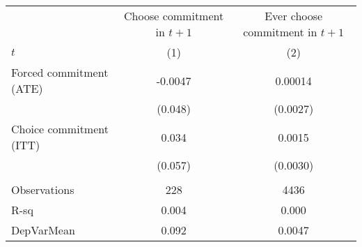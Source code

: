 \begin{tabular}{lcc}
\toprule
      & Choose commitment in $t+1$ & Ever choose commitment in $t+1$ \\
\cmidrule{2-3}$t$   & (1)   & (2) \\
\midrule
\midrule
Forced commitment (ATE) & -0.0047 & 0.00014 \\
      & (0.048) & (0.0027) \\
Choice commitment (ITT) & 0.034 & 0.0015 \\
      & (0.057) & (0.0030) \\
      &       &  \\
\midrule
Observations & 228   & 4436 \\
R-sq  & 0.004 & 0.000 \\
DepVarMean & 0.092 & 0.0047 \\
\bottomrule
\bottomrule
\end{tabular}%
